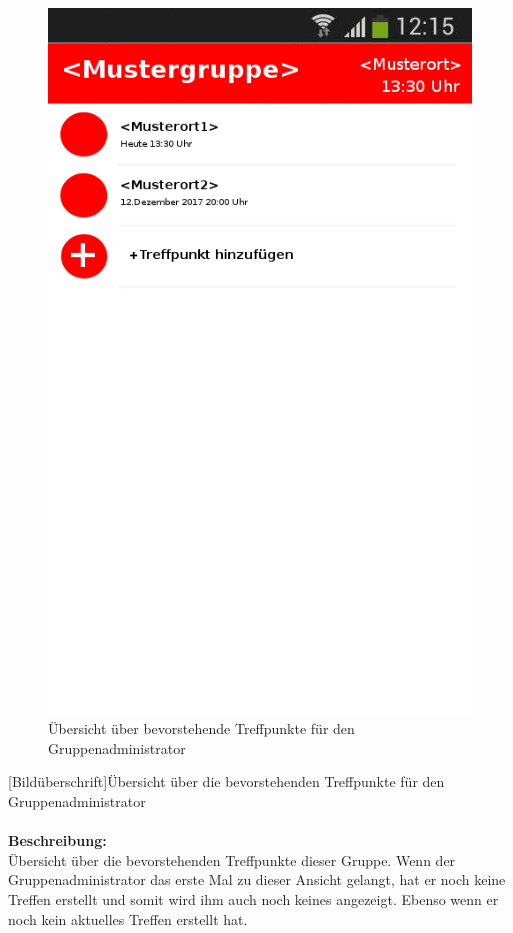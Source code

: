 \begin{figure} [H]
	\caption{Übersicht über bevorstehende Treffpunkte für den Gruppenadministrator}
\begin{center}
	\includegraphics[scale =0.5]{resources/images/treffpunktuebersicht_Admin.png}
\end{center}
\end{figure}
[Bildüberschrift]Übersicht über die bevorstehenden Treffpunkte für den Gruppenadministrator\\ \\
\textbf{Beschreibung:}\\
Übersicht über die bevorstehenden Treffpunkte dieser Gruppe. Wenn der Gruppenadministrator das erste Mal zu dieser Ansicht gelangt, hat er noch keine Treffen erstellt und somit wird ihm auch noch keines angezeigt. Ebenso wenn er noch kein aktuelles Treffen erstellt hat.\\

